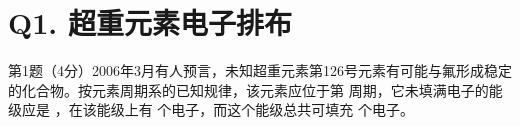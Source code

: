 \section*{Q1. 超重元素电子排布}
第1题（4分）2006年3⽉有⼈预⾔，未知超重元素第126号元素有可能与氟形成稳定的化合物。按元素周期系的已知规律，该元素应位于第 周期，它未填满电⼦的能级应是 ，在该能级上有 个电⼦，⽽这个能级总共可填充 个电⼦。

